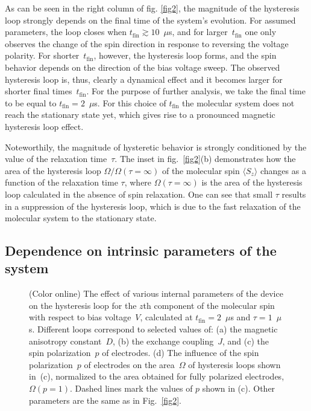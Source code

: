 \documentclass[doublecol]{epl2} %
\newcommand{\tfin}{t_\text{fin}}
\begin{document}
As can be seen in the right column of fig. \ref{fig2},
the magnitude of the hysteresis loop strongly depends on the final time
of the system's evolution. For assumed parameters,
the loop closes when \mbox{$\tfin \gtrsim 10$}~$\mu$s, and for larger~$\tfin$
one only observes the change of the spin direction in response to reversing the voltage polarity.
For shorter~$\tfin$, however, the hysteresis loop
forms, and the spin behavior depends on the 
direction of the bias voltage sweep.
The observed hysteresis loop is, thus, clearly a dynamical effect
and it becomes larger for shorter final times~$\tfin$.
For the purpose of further analysis, we take the final time 
to be equal to \mbox{$\tfin = 2$}~$\mu$s.
For this choice of $\tfin$ the molecular system does not reach the stationary state yet,
which gives rise to a pronounced magnetic hysteresis loop effect.

Noteworthily,  the magnitude of hysteretic behavior 
is strongly conditioned by the value of the relaxation time~$\tau$.
The inset in fig.~\ref{fig2}(b) demonstrates how the area of the hysteresis loop
\mbox{$\Omega/ \Omega(\tau=\infty)$} of the molecular spin $\langle S_z \rangle$ changes 
as a function of the relaxation time $\tau$,
where \mbox{$\Omega(\tau=\infty)$} is the area of the hysteresis loop calculated 
in the absence of spin relaxation.
One can see that small $\tau$ results in a suppression of the hysteresis loop,
which is due to the fast relaxation of the molecular system to the stationary state.

\subsection{Dependence on intrinsic parameters of the system}

%
\begin{figure}[t!]
  	\caption{
  	(Color online)
  	The effect of various internal parameters of the device on the hysteresis loop for the $z$th component of the molecular spin with respect to bias voltage~$V$, calculated at \mbox{$\tfin = 2$}~$\mu$s and \mbox{$\tau = 1$}~$\mu$s. Different loops correspond to selected values of: (a) the magnetic anisotropy constant~$D$, (b) the exchange coupling~$J$, and (c) the spin polarization~$p$ of electrodes.
  	(d) The influence of the spin polarization~$p$ of electrodes on the area~$\Omega$ of  hysteresis loops shown in~(c), normalized to the area obtained for fully polarized electrodes, \mbox{$\Omega(p=1)$}.
	Dashed lines mark the values of $p$ shown in (c).
    Other parameters are the same as in Fig.~\ref{fig2}.
    \label{fig3}
  	}
\end{figure}
%
\end{document}

